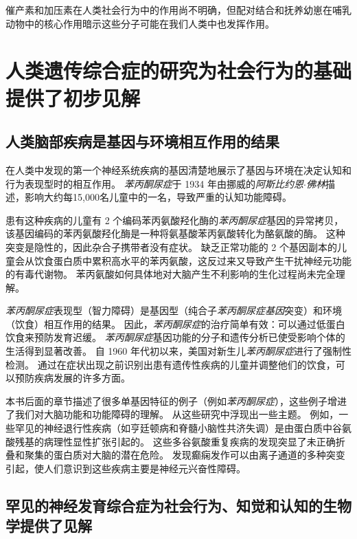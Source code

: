催产素和加压素在人类社会行为中的作用尚不明确，但配对结合和抚养幼崽在哺乳动物中的核心作用暗示这些分子可能在我们人类中也发挥作用。



\section{人类遗传综合症的研究为社会行为的基础提供了初步见解}

\subsection{人类脑部疾病是基因与环境相互作用的结果}

在人类中发现的第一个神经系统疾病的基因清楚地展示了基因与环境在决定认知和行为表现型时的相互作用。
\textit{苯丙酮尿症}于 1934 年由挪威的\textit{阿斯比约恩$\cdot$佛林}描述，影响大约每15,000名儿童中的一名，导致严重的认知功能障碍。


患有这种疾病的儿童有 2 个编码苯丙氨酸羟化酶的\textit{苯丙酮尿症}基因的异常拷贝，该基因编码的苯丙氨酸羟化酶是一种将氨基酸苯丙氨酸转化为酪氨酸的酶。
这种突变是隐性的，因此杂合子携带者没有症状。
缺乏正常功能的 2 个基因副本的儿童会从饮食蛋白质中累积高水平的苯丙氨酸，这反过来又导致产生干扰神经元功能的有毒代谢物。
苯丙氨酸如何具体地对大脑产生不利影响的生化过程尚未完全理解。



\textit{苯丙酮尿症}表现型（智力障碍）是基因型（纯合子\textit{苯丙酮尿症基因}突变）和环境（饮食）相互作用的结果。
因此，\textit{苯丙酮尿症}的治疗简单有效：可以通过低蛋白饮食来预防发育迟缓。
\textit{苯丙酮尿症}基因功能的分子和遗传分析已使受影响个体的生活得到显著改善。
自 1960 年代初以来，美国对新生儿\textit{苯丙酮尿症}进行了强制性检测。
通过在症状出现之前识别出患有遗传性疾病的儿童并调整他们的饮食，可以预防疾病发展的许多方面。



本书后面的章节描述了很多单基因特征的例子（例如\textit{苯丙酮尿症}），这些例子增进了我们对大脑功能和功能障碍的理解。
从这些研究中浮现出一些主题。
例如，一些罕见的神经退行性疾病（如亨廷顿病和脊髓小脑性共济失调）是由蛋白质中谷氨酸残基的病理性显性扩张引起的。
这些多谷氨酸重复疾病的发现突显了未正确折叠和聚集的蛋白质对大脑的潜在危险。
发现癫痫发作可以由离子通道的多种突变引起，使人们意识到这些疾病主要是神经元兴奋性障碍。



\subsection{罕见的神经发育综合症为社会行为、知觉和认知的生物学提供了见解}

